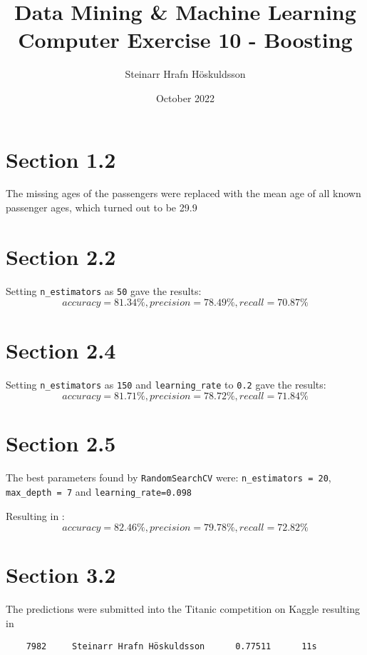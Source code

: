 \documentclass{article}
\title{Data Mining \& Machine Learning \\ \large Computer Exercise 10 - Boosting}
\author{Steinarr Hrafn Höskuldsson}
\date{October 2022}
\newcommand{\mycomment}[1]{}
\begin{document}
\maketitle
\mycomment{
\begin{figure}[h]
    \centering
    \texttt{[image: LAB3/Basic1.png]}
    \caption{"Switch test" Breadboard set up}
    \label{fig:Switch_test}
\end{figure}



}


\section*{Section 1.2}
 
 The missing ages of the passengers were replaced with the mean age of all known passenger ages, which turned out to be 29.9
 

\section*{Section 2.2}
Setting \verb!n_estimators! as \verb"50" gave the results:
$$ accuracy = 81.34\% ,  precision = 78.49\% ,  recall = 70.87\%$$


\section*{Section 2.4}
Setting \verb!n_estimators! as \verb"150"  and \verb!learning_rate! to \verb!0.2! gave the results:
$$ accuracy =81.71\% ,  precision = 78.72\% ,  recall = 71.84\%$$

\section*{Section 2.5}
The best parameters found by \verb"RandomSearchCV" were: \verb"n_estimators = 20", \verb"max_depth = 7" and \verb"learning_rate=0.098"

Resulting in :
$$ accuracy =82.46\% ,  precision = 79.78\% ,  recall = 72.82\%$$

\section*{Section 3.2}
The predictions were submitted into the Titanic competition on Kaggle resulting in 

\begin{verbatim}
    7982     Steinarr Hrafn Höskuldsson      0.77511      11s
\end{verbatim}
\end{document}
